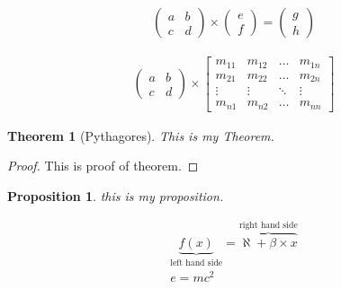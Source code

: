 \documentclass{article}
\newtheorem{theorem}{Theorem}
\newtheorem{prop}{Proposition}
\begin{document}
\begin{align}
    \left(
        \begin{array}{cc}
            a & b \\
            c & d
        \end{array}
    \right)
        \times
    \left(
        \begin{array}{c}
            e \\
            f
        \end{array}
    \right)
    =
    \left(
        \begin{array}{c}
            g \\
            h
        \end{array}
    \right)
\end{align}


\begin{align*}
        \begin{pmatrix}
            a & b \\
            c & d
        \end{pmatrix}
        \times
        \begin{bmatrix}
            m_{11} & m_{12} & \ldots & m_{1n} \\
            m_{21} & m_{22} & \ldots & m_{2n} \\
            \vdots & \vdots & \ddots & \vdots \\
            m_{n1} & m_{n2} & \ldots & m_{nn}
        \end{bmatrix}
\end{align*}
\begin{theorem}[Pythagores]
    This is my Theorem.
\end{theorem}
\begin{proof}
    This is proof of theorem.
\end{proof}
\begin{prop}
this is my proposition.
\end{prop}
\begin{align}
    \underbrace{f(x)}_{\text{left hand side}} =\overbrace{\aleph + \beta \times x}^{\text{right hand side}}\\
e=mc^2 \tag{EFE}
\end{align}
\end{document}
